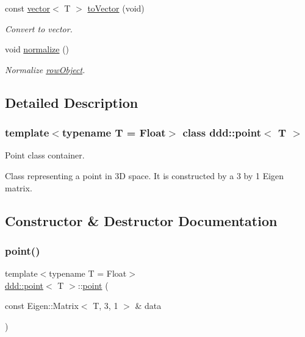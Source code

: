 \begin{DoxyCompactItemize}
const \hyperlink{classddd_1_1vector}{vector}$<$ T $>$ \hyperlink{classddd_1_1row_object_a59fbb28dfc75528f20a0032f6a7bdccd}{to\+Vector} (void)
\begin{DoxyCompactList}\small\item\em Convert to vector. \end{DoxyCompactList}\item 
\mbox{\label{classddd_1_1row_object_ad567bf2ca914b05a544b73bcec70cc57}} 
void \hyperlink{classddd_1_1row_object_ad567bf2ca914b05a544b73bcec70cc57}{normalize} ()
\begin{DoxyCompactList}\small\item\em Normalize \hyperlink{classddd_1_1row_object}{row\+Object}. \end{DoxyCompactList}\end{DoxyCompactItemize}


\subsection{Detailed Description}
\subsubsection*{template$<$typename T = Float$>$\newline
class ddd\+::point$<$ T $>$}

Point class container. 

Class representing a point in 3D space. It is constructed by a 3 by 1 Eigen matrix. 

\subsection{Constructor \& Destructor Documentation}
\mbox{\label{classddd_1_1point_a0146118d518509e9e7cdf4fb6733eb48}} 
\subsubsection{\texorpdfstring{point()}{point()}\hspace{0.1cm}{\footnotesize\ttfamily [1/2]}}
{\footnotesize\ttfamily template$<$typename T = Float$>$ \\
\hyperlink{classddd_1_1point}{ddd\+::point}$<$ T $>$\+::\hyperlink{classddd_1_1point}{point} (\begin{DoxyParamCaption}\item[{const Eigen\+::\+Matrix$<$ T, 3, 1 $>$ \&}]{data }\end{DoxyParamCaption})\hspace{0.3cm}{\ttfamily [inline]}}



